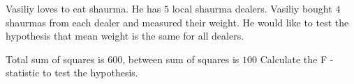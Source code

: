 
\begin{question}
Vasiliy loves to eat shaurma. He has \(5\) local shaurma dealers. Vasiliy bought \(4\) shaurmas
from each dealer and measured their weight. He would like to test the hypothesis that mean weight is the
same for all dealers.

Total sum of squares is \(600\), between sum of squares is \(100\)
Calculate the F -statistic to test the hypothesis.
\end{question}


